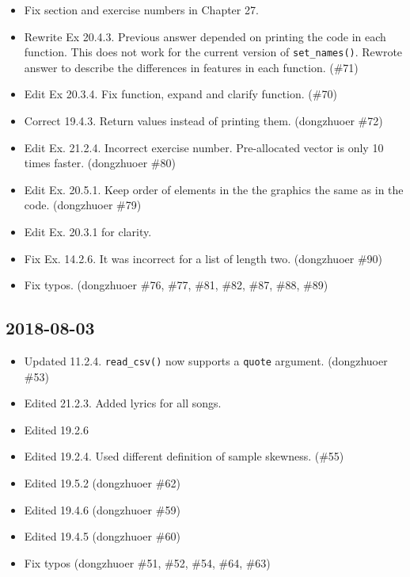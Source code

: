 \documentclass[]{book}
\providecommand{\tightlist}{%
  \setlength{\itemsep}{0pt}\setlength{\parskip}{0pt}}
\theoremstyle{plain}
\theoremstyle{remark}
\theoremstyle{definition}
\theoremstyle{definition}
\theoremstyle{definition}
\theoremstyle{remark}
\begin{document}
\begin{itemize}
\item
  Fix section and exercise numbers in Chapter 27.
\item
  Rewrite Ex 20.4.3. Previous answer depended on printing the code in
  each function. This does not work for the current version of
  \texttt{set\_names()}. Rewrote answer to describe the differences in
  features in each function. (\#71)
\item
  Edit Ex 20.3.4. Fix function, expand and clarify function. (\#70)
\item
  Correct 19.4.3. Return values instead of printing them. (dongzhuoer
  \#72)
\item
  Edit Ex. 21.2.4. Incorrect exercise number. Pre-allocated vector is
  only 10 times faster. (dongzhuoer \#80)
\item
  Edit Ex. 20.5.1. Keep order of elements in the the graphics the same
  as in the code. (dongzhuoer \#79)
\item
  Edit Ex. 20.3.1 for clarity.
\item
  Fix Ex. 14.2.6. It was incorrect for a list of length two. (dongzhuoer
  \#90)
\item
  Fix typos. (dongzhuoer \#76, \#77, \#81, \#82, \#87, \#88, \#89)
\end{itemize}

\hypertarget{section-3}{%
\subsection*{2018-08-03}\label{section-3}}

\begin{itemize}
\tightlist
\item
  Updated 11.2.4. \texttt{read\_csv()} now supports a \texttt{quote}
  argument. (dongzhuoer \#53)
\item
  Edited 21.2.3. Added lyrics for all songs.
\item
  Edited 19.2.6
\item
  Edited 19.2.4. Used different definition of sample skewness. (\#55)
\item
  Edited 19.5.2 (dongzhuoer \#62)
\item
  Edited 19.4.6 (dongzhuoer \#59)
\item
  Edited 19.4.5 (dongzhuoer \#60)
\item
  Fix typos (dongzhuoer \#51, \#52, \#54, \#64, \#63)
\end{itemize}
\end{document}
